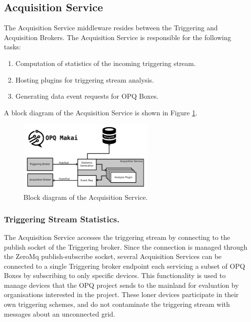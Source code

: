 \subsection{Acquisition Service}\label{subsec:acquisition-service}

The Acquisition Service middleware resides between the Triggering and Acquisition Brokers.
The Acquisition Service is responsible for the following tasks:
\begin{enumerate}
	\item Computation of statistics of the incoming triggering stream.
	\item Hosting plugins for triggering stream analysis.
	\item Generating data event requests for OPQ Boxes.
\end{enumerate}
A block diagram of the Acquisition Service is shown in Figure \ref{fig:opq:makai_aqs}.
\begin{figure}[h]
	\begin{center}
		\includegraphics[width=0.6\textwidth]{img/makai_aqs.pdf}
	\end{center}
	\caption{Block diagram of the Acquisition Service.}
	\label{fig:opq:makai_aqs}
\end{figure}

\subsubsection{Triggering Stream Statistics.}

The Acquisition Service accesses the triggering stream by connecting to the publish socket of the Triggering broker.
Since the connection is managed through the ZeroMq publish-subscribe socket, several Acquisition Services can be connected to a single Triggering broker endpoint each servicing a subset of OPQ Boxes by subscribing to only specific devices.
This functionality is used to manage devices that the OPQ project sends to the mainland for evaluation by organisations interested in the project.
These loner devices participate in their own triggering schemes, and do not contaminate the triggering stream with messages about an unconnected grid.

